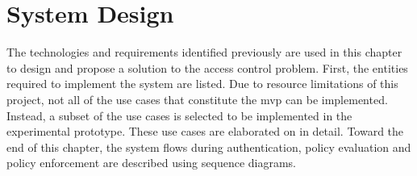 \section{System Design}\label{sec:design}

The technologies and requirements identified previously are used in this chapter to design and propose a solution to the access control problem. First, the entities required to implement the system are listed. Due to resource limitations of this project, not all of the use cases that constitute the \acrshort{mvp} can be implemented. Instead, a subset of the use cases is selected to be implemented in the experimental prototype. These use cases are elaborated on in detail. Toward the end of this chapter, the system flows during authentication, policy evaluation and policy enforcement are described using sequence diagrams.




